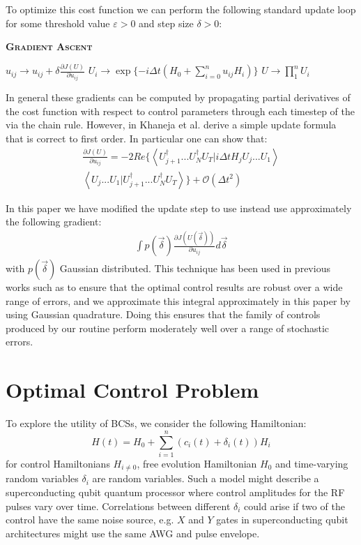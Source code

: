 \documentclass[aps,nofootinbib,pra,notitlepage,twocolumn]{revtex4-1}
\newcommand{\braket}[2]{\left\langle #1 | #2 \right\rangle}
\begin{document}
To optimize this cost function we can perform the following standard update loop for some threshold value $\varepsilon > 0$ and step size $\delta > 0$:
\begin{algorithm}[H]
  \caption{\textsc{\textbf{Gradient Ascent}}}
  \begin{algorithmic}
    \State $u_{ij} \rightarrow u_{ij} + \delta\frac{\partial J(U)}{\partial u_{ij}}$
    \State $U_i \rightarrow \exp\{-i\Delta t(H_0 + \sum_{i=0}^{n}u_{ij}H_i)\}$
    \EndFor
    \State $U \rightarrow \prod_1^nU_i$
    \EndWhile 
  \end{algorithmic}
\end{algorithm}

In general these gradients can be computed by propagating partial derivatives of the cost function with respect to control parameters through each timestep of the  via the chain rule. However, in \cite{Khaneja2005} Khaneja et al. derive a simple update formula that is correct to first order. In particular one can show that:
\begin{align}
\frac{\partial J(U)}{\partial u_{ij}} = -2Re\{\braket{{U_{j+1}^{\dagger}...U_N^{\dagger} U_T}}{i\Delta tH_jU_j...U_1}\\
\braket{U_j...U_1}{U_{j+1}^{\dagger}...U_N^{\dagger} U_T}\} +  \mathcal{O}(\Delta t^2)
\end{align}

In this paper we have modified the update step to use instead use approximately the following gradient:
\begin{align}\label{quadrature}
\int p(\vec{\delta})\frac{\partial J(U(\vec{\delta}))}{\partial u_{ij}} d\vec{\delta}
\end{align}
with $p(\vec{\delta})$ Gaussian distributed. This technique has been used in previous works such as \cite{Goerz2014} to ensure that the optimal control results are robust over a wide range of errors, and we approximate this integral approximately in this paper by using Gaussian quadrature. Doing this ensures that the family of controls produced by our routine perform moderately well over a range of stochastic errors.

\section{Optimal Control Problem}\label{ocp}
To explore the utility of BCSs, we consider the following Hamiltonian:
\begin{equation}\label{eq:2}
  H(t) = H_0 + \sum_{i=1}^n (c_i(t) + \delta_i(t))H_i
\end{equation}
for control Hamiltonians $H_{i\neq0}$, free evolution Hamiltonian $H_0$ and time-varying random variables $\delta_i$ are random variables. Such a model might describe a superconducting qubit quantum processor where control amplitudes for the RF pulses vary over time. Correlations between different $\delta_i$ could arise if two of the control have the same noise source, e.g. $X$ and $Y$ gates in superconducting qubit architectures might use the same AWG and pulse envelope.
\end{document}
